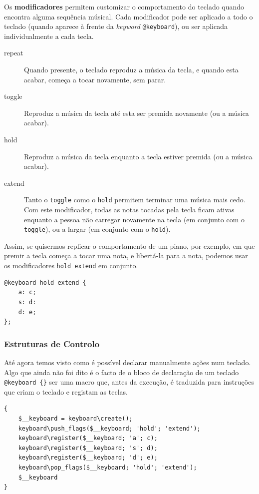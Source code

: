 Os \textbf{modificadores} permitem customizar o comportamento do teclado quando encontra alguma sequência músical. Cada modificador pode ser aplicado a todo o teclado (quando aparece à frente da \textit{keyword} \texttt{@keyboard}), ou ser aplicada individualmente a cada tecla.

\begin{description}
 \item[repeat] Quando presente, o teclado reproduz a música da tecla, e quando esta acabar, começa a tocar novamente, sem parar.
 \item[toggle] Reproduz a música da tecla até esta ser premida novamente (ou a música acabar).
 \item[hold] Reproduz a música da tecla enquanto a tecla estiver premida (ou a música acabar).
 \item[extend] Tanto o \texttt{toggle} como o \texttt{hold} permitem terminar uma música mais cedo. Com este modificador, todas as notas tocadas pela tecla ficam ativas enquanto a pessoa não carregar novamente na tecla (em conjunto com o \texttt{toggle}), ou a largar (em conjunto com o \texttt{hold}).
\end{description}

Assim, se quisermos replicar o comportamento de um piano, por exemplo, em que premir a tecla começa a tocar uma nota, e libertá-la para a nota, podemos usar os modificadores \texttt{hold extend} em conjunto.

\begin{lstlisting}[caption={Aplicar o modificar \texttt{hold extend} a um teclado inteiro}]
@keyboard hold extend {
    a: c;
    s: d:
    d: e;
};
\end{lstlisting}

\subsubsection{Estruturas de Controlo}
Até agora temos visto como é possível declarar manualmente ações num teclado. Algo que ainda não foi dito é o facto de o bloco de declaração de um teclado \verb|@keyboard {}| ser uma macro que, antes da execução, é traduzida para instruções que criam o teclado e registam as teclas.

\begin{lstlisting}[caption={Código gerado automaticamente para criação do teclado descrito no capitulo anterior}]
{
    $__keyboard = keyboard\create();
    keyboard\push_flags($__keyboard; 'hold'; 'extend');
    keyboard\register($__keyboard; 'a'; c);
    keyboard\register($__keyboard; 's'; d);
    keyboard\register($__keyboard; 'd'; e);
    keyboard\pop_flags($__keyboard; 'hold'; 'extend');
    $__keyboard
}
\end{lstlisting}

